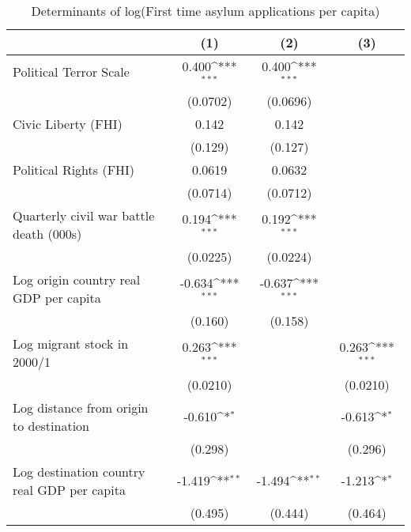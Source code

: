\begin{table}[htbp]\centering
\def\sym#1{\ifmmode^{#1}\else\(^{#1}\)\fi}
\caption{Determinants of log(First time asylum applications per capita)}
\begin{tabular}{l*{3}{c}}
\hline\hline
                    &\multicolumn{1}{c}{(1)}         &\multicolumn{1}{c}{(2)}         &\multicolumn{1}{c}{(3)}         \\
\hline
Political Terror Scale&       0.400\sym{***}&       0.400\sym{***}&                     \\
                    &    (0.0702)         &    (0.0696)         &                     \\
[1em]
Civic Liberty (FHI) &       0.142         &       0.142         &                     \\
                    &     (0.129)         &     (0.127)         &                     \\
[1em]
Political Rights (FHI)&      0.0619         &      0.0632         &                     \\
                    &    (0.0714)         &    (0.0712)         &                     \\
[1em]
Quarterly civil war battle death (000s)&       0.194\sym{***}&       0.192\sym{***}&                     \\
                    &    (0.0225)         &    (0.0224)         &                     \\
[1em]
Log origin country real GDP per capita&      -0.634\sym{***}&      -0.637\sym{***}&                     \\
                    &     (0.160)         &     (0.158)         &                     \\
[1em]
Log migrant stock in 2000/1&       0.263\sym{***}&                     &       0.263\sym{***}\\
                    &    (0.0210)         &                     &    (0.0210)         \\
[1em]
Log distance from origin to destination&      -0.610\sym{*}  &                     &      -0.613\sym{*}  \\
                    &     (0.298)         &                     &     (0.296)         \\
[1em]
Log destination country real GDP per capita&      -1.419\sym{**} &      -1.494\sym{**} &      -1.213\sym{*}  \\
                    &     (0.495)         &     (0.444)         &     (0.464)         \\

\end{tabular}
\end{table}
